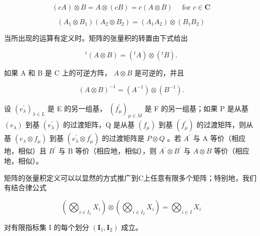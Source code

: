 \[
(c A) \otimes B = A \otimes (c B) = c (A \otimes B) \quad \text { for } c \in \mathbf {C}\tag{44}
\]

\[
(A _ {1} \otimes B _ {1}) (A _ {2} \otimes B _ {2}) = (A _ {1} A _ {2}) \otimes (B _ {1} B _ {2})\tag{45}
\]

当所出现的运算有定义时。矩阵的张量积的转置由下式给出

\[
{ } ^ { t } ( A \otimes B ) = ( { } ^ { t } A ) \otimes ( { } ^ { t } B ) .\tag{46}
\]

如果 A 和 B 是 C 上的可逆方阵， \(A \otimes B\) 是可逆的，并且

\[
(A \otimes B) ^ {- 1} = (A ^ {- 1}) \otimes (B ^ {- 1}).\tag{47}
\]

设 \((e_{\lambda}^{\prime})_{\lambda \in L}\) 是 E 的另一组基， \((f_{\mu}^{\prime})_{\mu \in M}\) 是 F 的另一组基；如果 P 是从基 \((e_{\lambda})\) 到基 \((e_{\lambda}^{\prime})\) 的过渡矩阵，Q 是从基 \((f_{\mu})\) 到基 \((f_{\mu}^{\prime})\) 的过渡矩阵，则从基 \((e_{\lambda} \otimes f_{\mu})\) 到基 \((e_{\lambda}^{\prime} \otimes f_{\mu}^{\prime})\) 的过渡矩阵是 \(P \otimes Q\) 。若 \(A^{\prime}\) 与 A 等价（相应地，相似）且 \(B^{\prime}\) 与 B 等价（相应地，相似），则 \(A^{\prime} \otimes B^{\prime}\) 与 \(A \otimes B\) 等价（相应地，相似）。

矩阵的张量积定义可以以显然的方式推广到C上任意有限多个矩阵；特别地，我们有结合律公式

\[
\left(\bigotimes_ {i \in I _ {1}} X _ {i}\right) \otimes \left(\bigotimes_ {i \in I _ {2}} X _ {i}\right) = \bigotimes_ {i \in I} X _ {i}\tag{48}
\]

对有限指标集 I 的每个划分 \((\mathbf{I}_{1}, \mathbf{I}_{2})\) 成立。

